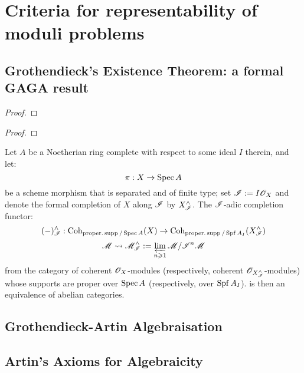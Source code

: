 \section{Criteria for representability of moduli problems}
    \subsection{Grothendieck's Existence Theorem: a formal GAGA result}
        \begin{lemma}
            
        \end{lemma}
            \begin{proof}
                
            \end{proof}
        \begin{lemma}
            
        \end{lemma}
            \begin{proof}
                
            \end{proof}
        \begin{remark}
            
        \end{remark}
        \begin{theorem}
            Let $A$ be a Noetherian ring complete with respect to some ideal $I$ therein, and let:
                $$\pi: X \to \operatorname{Spec} A$$
            be a scheme morphism that is separated and of finite type; set $\mathscr{I} := I \mathscr{O}_X$ and denote the formal completion of $X$ along $\mathscr{I}$ by $X^{\wedge}_{\mathscr{I}}$. The $\mathscr{I}$-adic completion functor:
                $$(-)^{\wedge}_{\mathscr{I}}: \mathrm{Coh}_{\mathrm{proper}.\operatorname{supp}/\operatorname{Spec} A}(X) \to \mathrm{Coh}_{\mathrm{proper}.\operatorname{supp}/\operatorname{Spf} A_I}(X^{\wedge}_{\mathscr{I}})$$
                $$\mathscr{M} \leadsto \mathscr{M}^{\wedge}_{\mathscr{I}} := \varprojlim_{n \geqslant 1} \mathscr{M}/\mathscr{I}^n\mathscr{M}$$
            from the category of coherent $\mathscr{O}_X$-modules (respectively, coherent $\mathscr{O}_{X^{\wedge}_{\mathscr{I}}}$-modules) whose supports are proper over $\operatorname{Spec} A$ (respectively, over $\operatorname{Spf} A_I$). is then an equivalence of abelian categories.
        \end{theorem}

    \subsection{Grothendieck-Artin Algebraisation}

    \subsection{Artin's Axioms for Algebraicity}